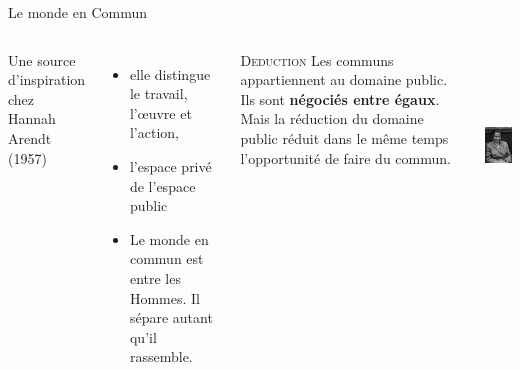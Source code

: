 \documentclass[newPxFont]{beamer}
\begin{document}
\begin{frame}[c]{Le monde en Commun}
  \vspace{-1cm}
  \begin{columns}[onlytextwidth,T]
    \column{\dimexpr\linewidth-30mm-5mm}
      Une source d'inspiration chez Hannah Arendt (1957)
      \begin{itemize}
        \item elle distingue le travail, l'œuvre et l'action,
        \item l'espace privé de l'espace public
        \item Le monde en commun est entre les Hommes. Il sépare autant qu'il rassemble.
      \end{itemize}

    \small{
      \begin{alertblock}{\textsc{Deduction}}
        Les communs appartiennent au domaine public. Ils sont \textbf{négociés entre égaux}. Mais la réduction du domaine public réduit dans le même temps l’opportunité de faire du commun.
      \end{alertblock}
    }
  \column{30mm}
    \includegraphics[height=5cm]{img/Hannah_Arendt.jpg}
    \end{columns}
  \end{frame}
\end{document}
